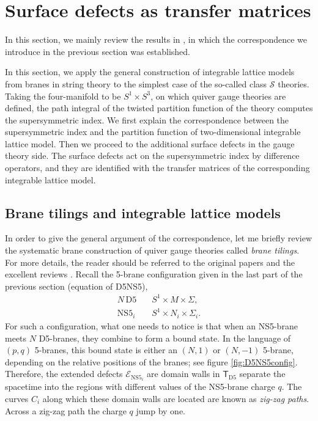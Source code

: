 






\section{Surface defects as transfer matrices}

In this section, we mainly review the results in \cite{Maruyoshi:2016caf}, 
in which the correspondence we introduce in the previous section was established. 


In this section, we apply the general construction of integrable lattice
models from branes in string theory to the simplest case of the so-called
class $\mathcal{S}$ theories. Taking the four-manifold to be $S^{1} \times S^{3}$,
on which quiver gauge theories are defined, the path integral of the
twisted partition function of the theory computes the supersymmetric
index. We first explain the correspondence between the supersymmetric
index and the partition function of two-dimensional integrable lattice
model. Then we proceed to the additional surface defects in the gauge
theory side. The surface defects act on the supersymmetric index by
difference operators, and they are identified with the transfer matrices
of the corresponding integrable lattice model. 





\subsection{Brane tilings and integrable lattice models}

In order to give the general argument of the correspondence, let me
briefly review the systematic brane construction of quiver gauge theories
called \emph{brane tilings}. For more details, the reader should be
referred to the original papers and the excellent reviews \cite{Hanany:2005ve,Franco:2005rj,Kennaway:2007tq,Yamazaki:2008bt}. Recall the 5-brane configuration given
in the last part of the previous section (equation of D5NS5), 
\begin{align*}
    N\,\mathrm{D5}    & \quad S^{1} \times M \times \Sigma,  \\
    \mathrm{NS5}_{i} & \quad S^{1} \times N_{i} \times \Sigma_{i}.
\end{align*}
For such a configuration, what one needs to notice is that when an
NS5-brane meets $N$ D5-branes, they combine to form a bound state.
In the language of $\left( p,q \right)$ 5-branes, this bound state
is either an $\left( N,1 \right)$ or $\left( N,-1 \right)$ 5-brane,
depending on the relative positions of the branes; see figure \ref{fig:D5NS5config}. Therefore,
the extended defects $\mathcal{E}_{\mathrm{NS5}_{i}}$ are domain
walls in $\mathsf{T}_{\mathrm{D5}}$ separate the spacetime into the
regions with different values of the NS5-brane charge $q$. The curves
$C_{i}$ along which these domain walls are located are known as \emph{zig-zag
paths}. Across a zig-zag path the charge $q$ jump by one. 


